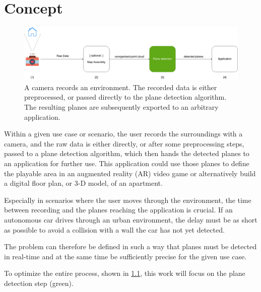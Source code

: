 \documentclass[main.tex]{subfiles}
\begin{document}
\chapter{Concept} \label{chap:Concept}


\begin{figure}[!ht]
	\centering
	\includegraphics[width=15 cm]{images/concept.png}
    \caption{A camera records an environment. The recorded data is either preprocessed, or passed directly to the plane detection algorithm.
    The resulting planes are subsequently exported to an arbitrary application.}
    \label{fig:concept}
\end{figure}



Within a given use case or scenario, the user records the surroundings with a camera, and the raw data is either 
directly, or after some preprocessing steps, passed to a plane detection algorithm, which then hands the detected planes to an application for further use. 
This application could use those planes to define the playable area in an augmented reality (AR) video game or alternatively build a digital floor 
plan, or 3-D model, of an apartment.  

Especially in scenarios where the user moves through the environment, the time between recording and the planes reaching the application is crucial. 
If an autonomous car drives through an urban environment, the delay must be as short as possible to avoid a collision with a wall the car has not yet detected.

The problem can therefore be defined in such a way that planes must be detected in real-time and at the same time be sufficiently precise for the given use case.

To optimize the entire process, shown in \ref{fig:concept}, this work will focus on the plane detection step (green).
\end{document}
